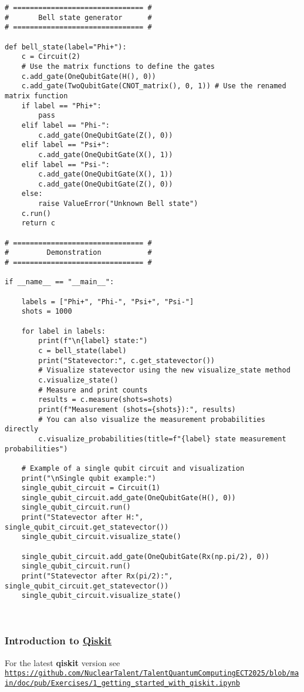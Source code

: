 \documentclass{beamer}
\begin{document}
\begin{frame}
\begin{verbatim}
# =============================== #
#       Bell state generator      #
# =============================== #

def bell_state(label="Phi+"):
    c = Circuit(2)
    # Use the matrix functions to define the gates
    c.add_gate(OneQubitGate(H(), 0))
    c.add_gate(TwoQubitGate(CNOT_matrix(), 0, 1)) # Use the renamed matrix function
    if label == "Phi+":
        pass
    elif label == "Phi-":
        c.add_gate(OneQubitGate(Z(), 0))
    elif label == "Psi+":
        c.add_gate(OneQubitGate(X(), 1))
    elif label == "Psi-":
        c.add_gate(OneQubitGate(X(), 1))
        c.add_gate(OneQubitGate(Z(), 0))
    else:
        raise ValueError("Unknown Bell state")
    c.run()
    return c

# =============================== #
#         Demonstration           #
# =============================== #

if __name__ == "__main__":

    labels = ["Phi+", "Phi-", "Psi+", "Psi-"]
    shots = 1000

    for label in labels:
        print(f"\n{label} state:")
        c = bell_state(label)
        print("Statevector:", c.get_statevector())
        # Visualize statevector using the new visualize_state method
        c.visualize_state()
        # Measure and print counts
        results = c.measure(shots=shots)
        print(f"Measurement (shots={shots}):", results)
        # You can also visualize the measurement probabilities directly
        c.visualize_probabilities(title=f"{label} state measurement probabilities")

    # Example of a single qubit circuit and visualization
    print("\nSingle qubit example:")
    single_qubit_circuit = Circuit(1)
    single_qubit_circuit.add_gate(OneQubitGate(H(), 0))
    single_qubit_circuit.run()
    print("Statevector after H:", single_qubit_circuit.get_statevector())
    single_qubit_circuit.visualize_state()

    single_qubit_circuit.add_gate(OneQubitGate(Rx(np.pi/2), 0))
    single_qubit_circuit.run()
    print("Statevector after Rx(pi/2):", single_qubit_circuit.get_statevector())
    single_qubit_circuit.visualize_state()



\end{verbatim}
\end{frame}

\begin{frame}
\frametitle{Introduction to \href{{https://qiskit.org/}}{Qiskit}}

For the latest \textbf{qiskit} version see \href{{https://github.com/NuclearTalent/TalentQuantumComputingECT2025/blob/main/doc/pub/Exercises/1_getting_started_with_qiskit.ipynb}}{\nolinkurl{https://github.com/NuclearTalent/TalentQuantumComputingECT2025/blob/main/doc/pub/Exercises/1_getting_started_with_qiskit.ipynb}}
\end{frame}
\end{document}
